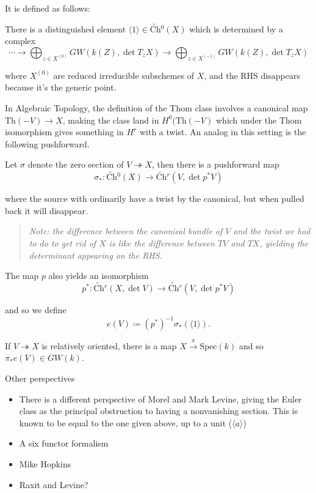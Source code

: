 \documentclass[11pt]{scrreprt}
\theoremstyle{definition}
\providecommand{\tightlist}{%
  \setlength{\itemsep}{0pt}\setlength{\parskip}{0pt}}
\newcommand{\spec}[0]{{\mathrm{Spec}}}
\newcommand{\mapsvia}[1]{\xrightarrow{#1}}
\newcommand{\generators}[1]{\langle{#1}\rangle}
\newcommand{\covers}[0]{\twoheadrightarrow}
\newcommand{\definedas}[0]{\coloneqq}
\newcommand{\surjects}[0]{\twoheadrightarrow}
\begin{document}
It is defined as follows:

There is a distinguished element
\(\generators{1}\in \widetilde{\text{Ch}}{}^0(X)\) which is determined
by a complex \[
\cdots \to \bigoplus_{z\in X^{(0)}} GW(k(Z), \det T_zX) \to \bigoplus_{z\in X^{(-1)}} GW(k(Z), \det T_zX)
\]

where \(X^{(0)}\) are reduced irreducible subschemes of \(X\), and the
RHS disappears because it's the generic point.

In Algebraic Topology, the definition of the Thom class involves a
canonical map \(\text{Th}(-V)\to X\), making the class land in
\(H^0(\text{Th}(-V)\) which under the Thom isomorphism gives something
in \(H^r\) with a twist. An analog in this setting is the following
pushforward.

Let \(\sigma\) denote the zero section of \(V\covers X\), then there is
a pushforward map \[
\sigma_*: \widetilde{\text{Ch}}{}^0(X) \to \widetilde{\text{Ch}}{}^r(V, \det p^* V)
\]

where the source with ordinarily have a twist by the canonical, but when
pulled back it will disappear.

\begin{quote}\textit{
Note: the difference between the canonical bundle of \(V\) and the twist
we had to do to get rid of \(X\) is like the difference between \(TV\)
and \(TX\), yielding the determinant appearing on the RHS.
}\end{quote}

The map \(p\) also yields an isomorphism \[
p^*: \widetilde{\text{Ch}}{}^r(X, \det V) \to \widetilde{\text{Ch}}{}^r(V, \det p^* V)
\]

and so we define \[
e(V) \definedas (p^*)^{-1}\sigma_*(\generators{1}).
\]

If \(V \surjects X\) is relatively oriented, there is a map
\(X \mapsvia \pi \spec(k)\) and so \(\pi_* e(V) \in GW(k)\).

Other perspectives

\begin{itemize}
\tightlist
\item
  There is a different perspective of Morel and Mark Levine, giving the
  Euler class as the principal obstruction to having a nonvanishing
  section. This is known to be equal to the one given above, up to a
  unit (\(\generators{a}\))
\item
  A six functor formalism
\item
  Mike Hopkins
\item
  Raxit and Levine?
\end{itemize}
\end{document}
